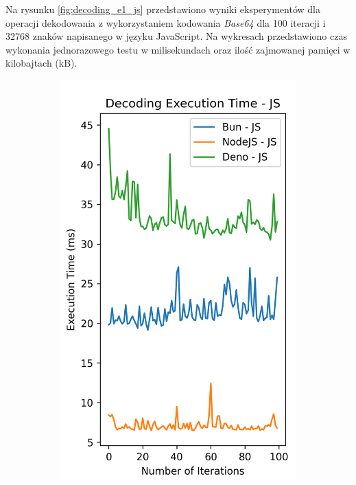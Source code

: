 Na rysunku \ref{fig:decoding_e1_js} przedstawiono wyniki eksperymentów dla operacji dekodowania z wykorzystaniem kodowania \textit{Base64} dla 100 iteracji i 32768 znaków napisanego w języku JavaScript. Na wykresach przedstawiono czas wykonania jednorazowego testu w milisekundach oraz ilość zajmowanej pamięci w kilobajtach (kB).

\begin{figure}[H]
  \centering
  \begin{subfigure}[b]{0.42\textwidth}
    \centering
    \includegraphics[width=\textwidth]{Figures/coding/base64_100_decoding_js_time.png}

\end{subfigure}
\end{figure}
